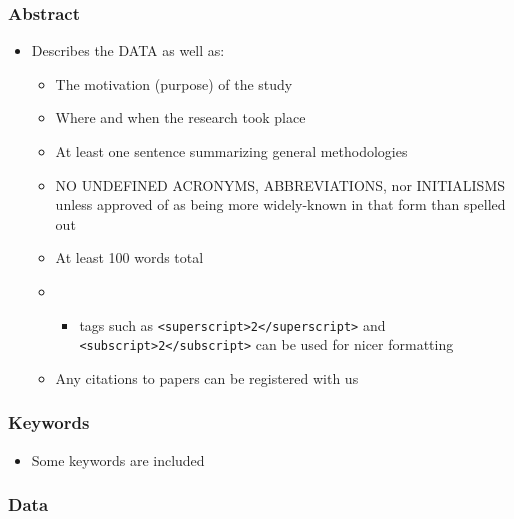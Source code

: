 \documentclass[
  letterpaper,
  DIV=11,
  numbers=noendperiod]{scrreprt}
\providecommand{\tightlist}{%
  \setlength{\itemsep}{0pt}\setlength{\parskip}{0pt}}\usepackage{longtable,booktabs,array}
\begin{document}
\hypertarget{abstract}{%
\subsubsection{Abstract}\label{abstract}}

\begin{itemize}
\tightlist
\item
  Describes the DATA as well as:

  \begin{itemize}
  \item
    The motivation (purpose) of the study
  \item
    Where and when the research took place
  \item
    At least one sentence summarizing general methodologies
  \item
    NO UNDEFINED ACRONYMS, ABBREVIATIONS, nor INITIALISMS unless
    approved of as being more widely-known in that form than spelled out
  \item
    At least 100 words total
  \item
    \begin{itemize}
    \tightlist
    \item
      tags such as
      \texttt{\textless{}superscript\textgreater{}2\textless{}/superscript\textgreater{}}
      and
      \texttt{\textless{}subscript\textgreater{}2\textless{}/subscript\textgreater{}}
      can be used for nicer formatting
    \end{itemize}
  \item
    Any citations to papers can be registered with us
  \end{itemize}
\end{itemize}

\hypertarget{keywords}{%
\subsubsection{Keywords}\label{keywords}}

\begin{itemize}
\tightlist
\item
  Some keywords are included
\end{itemize}

\hypertarget{data}{%
\subsubsection{Data}\label{data}}
\end{document}
